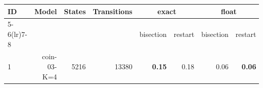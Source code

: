 \begin{longtable}{lrr@{\hskip 12pt}r@{\hskip 12pt}r@{\hskip 12pt}r@{\hskip 12pt}r@{\hskip 12pt}r}
\toprule
ID & Model & States & Transitions & \multicolumn{2}{c}{exact} & \multicolumn{2}{c}{float} \\
\cmidrule(lr){5-6}\cmidrule(lr){7-8}
 & & &  & bisection & restart & bisection & restart \\
\midrule
\endhead
1 & \multirow{1}{*}{coin-03-K=4} & \multirow{1}{*}{5216} & \multirow{1}{*}{13380} & \textbf{0.15} & 0.18 & 0.06 & \textbf{0.06} \\
\bottomrule
\end{longtable}